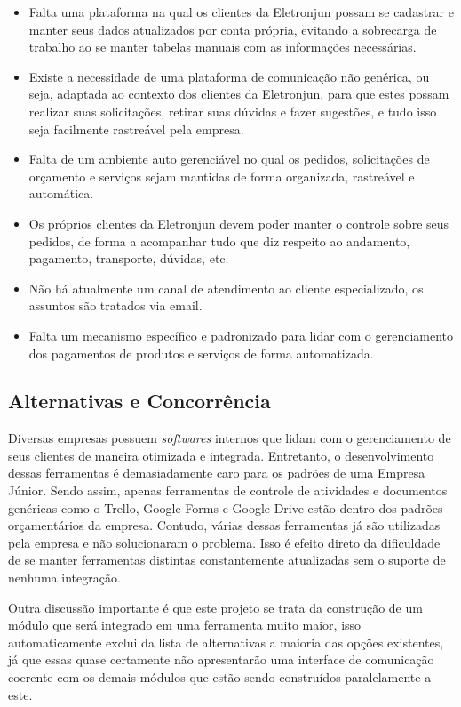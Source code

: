       \begin{itemize}
        \item Falta uma plataforma na qual os clientes da Eletronjun possam se cadastrar e manter seus dados atualizados por conta própria, evitando a sobrecarga de trabalho ao se manter tabelas manuais com as informações necessárias.
        \item Existe a necessidade de uma plataforma de comunicação não genérica, ou seja, adaptada ao contexto dos clientes da Eletronjun, para que estes possam realizar suas solicitações, retirar suas dúvidas e fazer sugestões, e tudo isso seja facilmente rastreável pela empresa.
        \item Falta de um ambiente auto gerenciável no qual os pedidos, solicitações de orçamento e serviços sejam mantidas de forma organizada, rastreável e automática. 
        \item Os próprios clientes da Eletronjun devem poder manter o controle sobre seus pedidos, de forma a acompanhar tudo que diz respeito ao andamento, pagamento, transporte, dúvidas, etc.
        \item Não há atualmente um canal de atendimento ao cliente especializado, os assuntos são tratados via email.
        \item Falta um mecanismo específico e padronizado para lidar com o gerenciamento dos pagamentos de produtos e serviços de forma automatizada.
      \end{itemize}

    \subsection{Alternativas e Concorrência}
Diversas empresas possuem \textit{softwares} internos que lidam com o gerenciamento de seus clientes de maneira otimizada e integrada. Entretanto, o desenvolvimento dessas ferramentas é demasiadamente caro para os padrões de uma Empresa Júnior. Sendo assim, apenas ferramentas de controle de atividades e documentos genéricas como o Trello, Google Forms e Google Drive estão dentro dos padrões orçamentários da empresa. Contudo, várias dessas ferramentas já são utilizadas pela empresa e não solucionaram o problema. Isso é efeito direto da dificuldade de se manter ferramentas distintas constantemente atualizadas sem o suporte de nenhuma integração.

Outra discussão importante é que este projeto se trata da construção de um módulo que será integrado em uma ferramenta muito maior, isso automaticamente exclui da lista de alternativas a maioria das opções existentes, já que essas quase certamente não apresentarão uma interface de comunicação coerente com os demais módulos que estão sendo construídos paralelamente a este.

